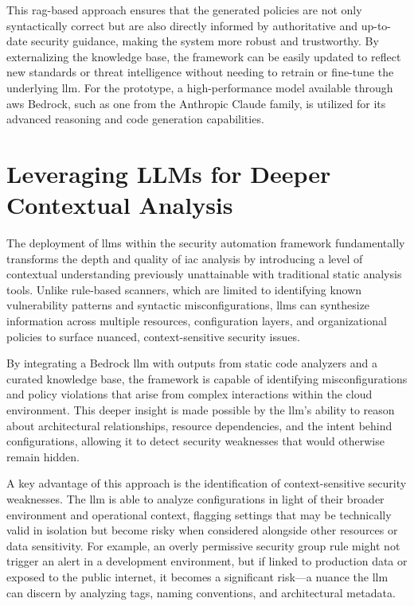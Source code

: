 This \gls{rag}-based approach ensures that the generated policies are not only syntactically correct but are also directly informed by authoritative and up-to-date security guidance, making the system more robust and trustworthy. By externalizing the knowledge base, the framework can be easily updated to reflect new standards or threat intelligence without needing to retrain or fine-tune the underlying \gls{llm}. For the prototype, a high-performance model available through \gls{aws} Bedrock, such as one from the Anthropic Claude family, is utilized for its advanced reasoning and code generation capabilities.


\section{Leveraging LLMs for Deeper Contextual Analysis} %
\label{sec:Leveraging LLMs for Deeper Contextual Analysis}

The deployment of \glspl{llm} within the security automation framework fundamentally transforms the depth and quality of \gls{iac} analysis by introducing a level of contextual understanding previously unattainable with traditional static analysis tools\cite{li_iris_2025, andrade_enhancing_2025-1}. Unlike rule-based scanners, which are limited to identifying known vulnerability patterns and syntactic misconfigurations, \glspl{llm} can synthesize information across multiple resources, configuration layers, and organizational policies to surface nuanced, context-sensitive security issues\cite{li_iris_2025}.

By integrating a Bedrock \gls{llm} with outputs from static code analyzers and a curated knowledge base, the framework is capable of identifying misconfigurations and policy violations that arise from complex interactions within the cloud environment\cite{andrade_enhancing_2025-1}. This deeper insight is made possible by the \gls{llm}'s ability to reason about architectural relationships, resource dependencies, and the intent behind configurations, allowing it to detect security weaknesses that would otherwise remain hidden\cite{li_iris_2025, andrade_enhancing_2025-1}.

A key advantage of this approach is the identification of context-sensitive security weaknesses. The \gls{llm} is able to analyze configurations in light of their broader environment and operational context, flagging settings that may be technically valid in isolation but become risky when considered alongside other resources or data sensitivity. For example, an overly permissive security group rule might not trigger an alert in a development environment, but if linked to production data or exposed to the public internet, it becomes a significant risk—a nuance the \gls{llm} can discern by analyzing tags, naming conventions, and architectural metadata\cite{andrade_enhancing_2025-1}.

